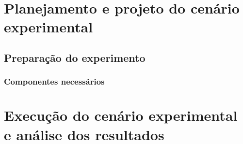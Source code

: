 \section{Planejamento e projeto do cenário experimental}

\subsection{Preparação do experimento}

\subsubsection{Componentes necessários}

\section{Execução do cenário experimental e análise dos resultados}

